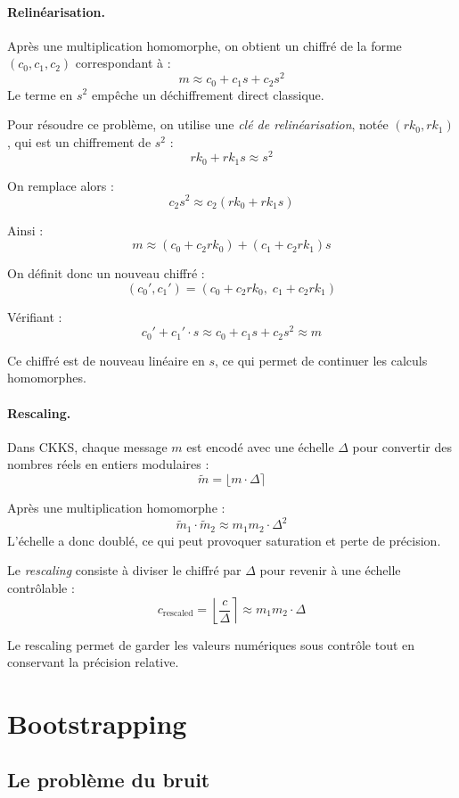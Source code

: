 \documentclass[11pt,a4paper]{article}
\begin{document}
\paragraph{Relinéarisation.}
Après une multiplication homomorphe, on obtient un chiffré de la forme $(c_0, c_1, c_2)$ correspondant à :
\[
m \approx c_0 + c_1 s + c_2 s^2
\]
Le terme en $s^2$ empêche un déchiffrement direct classique.

Pour résoudre ce problème, on utilise une \emph{clé de relinéarisation}, notée $(rk_0, rk_1)$, qui est un chiffrement de $s^2$ :
\[
rk_0 + rk_1 s \approx s^2
\]

On remplace alors :
\[
c_2 s^2 \approx c_2 (rk_0 + rk_1 s)
\]

Ainsi :
\[
m \approx (c_0 + c_2 rk_0) + (c_1 + c_2 rk_1)s
\]

On définit donc un nouveau chiffré :
\[
(c_0', c_1') = (c_0 + c_2 rk_0,\; c_1 + c_2 rk_1)
\]

Vérifiant : 
\[
c_0' + c_1' \cdot s \approx c_0 + c_1 s + c_2 s^2 \approx m
\]

Ce chiffré est de nouveau linéaire en $s$, ce qui permet de continuer les calculs homomorphes.

\paragraph{Rescaling.}
Dans CKKS, chaque message $m$ est encodé avec une échelle $\Delta$ pour convertir des nombres réels en entiers modulaires :
\[
\tilde{m} = \lfloor m \cdot \Delta \rceil
\]

Après une multiplication homomorphe :
\[
\tilde{m}_1 \cdot \tilde{m}_2 \approx m_1 m_2 \cdot \Delta^2
\]
L'échelle a donc doublé, ce qui peut provoquer saturation et perte de précision.

Le \emph{rescaling} consiste à diviser le chiffré par $\Delta$ pour revenir à une échelle contrôlable :
\[
c_{\text{rescaled}} = \left\lfloor \frac{c}{\Delta} \right\rceil \approx m_1 m_2 \cdot \Delta
\]

Le rescaling permet de garder les valeurs numériques sous contrôle tout en conservant la précision relative.


\section{Bootstrapping}

\subsection{Le problème du bruit}
\end{document}

